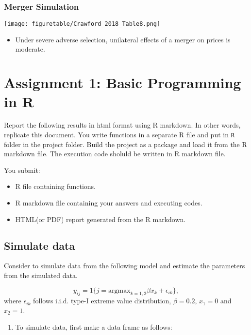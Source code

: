 \documentclass[
]{book}
\providecommand{\tightlist}{%
  \setlength{\itemsep}{0pt}\setlength{\parskip}{0pt}}
\begin{document}
\hypertarget{merger-simulation-2}{%
\subsection{Merger Simulation}\label{merger-simulation-2}}

\texttt{[image: figuretable/Crawford\_2018\_Table8.png]}

\begin{itemize}
\tightlist
\item
  Under severe adverse selection, unilateral effects of a merger on prices is moderate.
\end{itemize}

\hypertarget{assignment1}{%
\chapter{Assignment 1: Basic Programming in R}\label{assignment1}}

Report the following results in html format using R markdown. In other words, replicate this document. You write functions in a separate R file and put in \texttt{R} folder in the project folder. Build the project as a package and load it from the R markdown file. The execution code sholuld be written in R markdown file.

You submit:

\begin{itemize}
\tightlist
\item
  R file containing functions.
\item
  R markdown file containing your answers and executing codes.
\item
  HTML(or PDF) report generated from the R markdown.
\end{itemize}

\hypertarget{simulate-data}{%
\section{Simulate data}\label{simulate-data}}

Consider to simulate data from the following model and estimate the parameters from the simulated data.

\[
y_{ij} = 1\{j = \text{argmax}_{k = 1, 2} \beta x_k + \epsilon_{ik} \},
\]
where \(\epsilon_{ik}\) follows i.i.d. type-I extreme value distribution, \(\beta = 0.2\), \(x_1 = 0\) and \(x_2 = 1\).

\begin{enumerate}
\def\labelenumi{\arabic{enumi}.}
\tightlist
\item
  To simulate data, first make a data frame as follows:
\end{enumerate}
\end{document}
